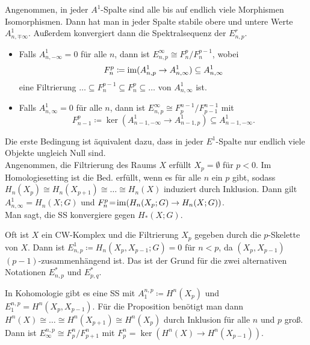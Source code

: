 \documentclass{cheat-sheet}
\newcommand{\nacong}{\!\cong\!} %
\begin{document}
\begin{prop}
  Angenommen, in jeder $A^1$-Spalte sind alle bis auf endlich viele Morphismen Isomorphismen. Dann hat man in jeder Spalte stabile obere und untere Werte $A^1_{n, \mp \infty}$. Außerdem konvergiert dann die Spektralsequenz der $E^r_{n,p}$.
  \begin{itemize}
    \item Falls $A^1_{n,-\infty} = 0$ für alle $n$, dann ist $E^\infty_{n,p} \cong F^p_n / F^{p-1}_n$, wobei
    \[ F^p_n \coloneqq \operatorname{im}(A^1_{n,p} \to A^1_{n,\infty}) \subseteq A^1_{n,\infty} \]
    eine Filtrierung $\ldots \subseteq F^{p-1}_n \subseteq F^p_n \subseteq \ldots$ von $A^1_{n,\infty}$ ist.
    \item Falls $A^1_{n,\infty} = 0$ für alle $n$, dann ist $E^\infty_{n,p} \cong F^{n-1}_p / F^{n-1}_{p-1}$ mit
    \[ F^p_{n-1} \coloneqq \ker(A^1_{n-1,-\infty} \to A^1_{n-1,p}) \subseteq A^1_{n-1,-\infty}. \]
  \end{itemize}
\end{prop}

\begin{bem}
  Die erste Bedingung ist äquivalent dazu, dass in jeder $E^1$-Spalte nur endlich viele Objekte ungleich Null sind. \\
  Angenommen, die Filtrierung des Raums $X$ erfüllt $X_p = \emptyset$ für $p < 0$.
  Im Homologiesetting ist die Bed. erfüllt, wenn es für alle $n$ ein $p$ gibt, sodass $H_n(X_p) \nacong H_n(X_{p+1}) \nacong \ldots \nacong H_n(X)$ induziert durch Inklusion.
  Dann gilt $A^1_{n,\infty} \!=\! H_n(X; G)$ und $F^p_n \!=\! \operatorname{im}(H_n(X_p; G) \to H_n(X; G))$. \\
  Man sagt, die SS konvergiere gegen $H_*(X; G)$.
\end{bem}

\begin{bem}
  Oft ist $X$ ein CW-Komplex und die Filtrierung $X_p$ gegeben durch die $p$-Skelette von $X$. Dann ist $E^1_{n,p} \coloneqq H_n(X_p, X_{p-1}; G) = 0$ für $n < p$, da $(X_p, X_{p-1})$ $(p\!-\!1)$-zusammenhängend ist. Das ist der Grund für die zwei alternativen Notationen $E^*_{n,p}$ und $E^*_{p,q}$.
\end{bem}

\begin{bem}
  In Kohomologie gibt es eine SS mit $A^{n,p}_1 \coloneqq H^n(X_p)$ und $E^{n,p}_1 = H^n(X_p, X_{p-1})$. Für die Proposition benötigt man dann $H^n(X) \nacong \ldots \nacong H^n(X_{p+1}) \nacong H^n(X_p)$ durch Inklusion für alle $n$ und $p$ groß. Dann ist $E^{n,p}_\infty \cong F^n_p / F^n_{p+1}$ mit $F^n_p \!=\! \ker(H^n(X) \!\to\! H^n(X_{p-1}))$.
\end{bem}
\end{document}

